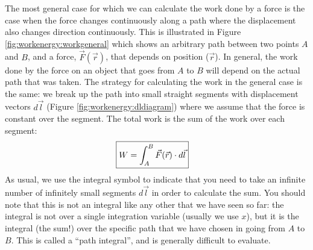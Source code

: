 The most general case for which we can calculate the work done by a force is the case when the force changes continuously along a path where the displacement also changes direction continuously. This is illustrated in Figure \ref{fig:workenergy:workgeneral} which shows an arbitrary path between two points $A$ and $B$, and a force, $\vec F(\vec r)$, that depends on position ($\vec r$). In general, the work done by the force on an object that goes from $A$ to $B$ will depend on the actual path that was taken.
The strategy for calculating the work in the general case is the same: we break up the path into small straight segments with displacement vectors $d\vec l$ (Figure \ref{fig:workenergy:dldiagram}) where we assume that the force is constant over the segment. The total work is the sum of the work over each segment:
\begin{align}
\Aboxed{W = \int_A^B \vec F(\vec r) \cdot d\vec l}
\end{align}
As usual, we use the integral symbol to indicate that you need to take an infinite number of infinitely small segments $d\vec l$ in order to calculate the sum.
You should note that this is not an integral like any other that we have seen so far: the integral is not over a single integration variable (usually we use $x$), but it is the integral (the sum!) over the specific path that we have chosen in going from $A$ to $B$. This is called a ``path integral'', and is generally difficult to evaluate. 
\vspace{-0.25cm}
